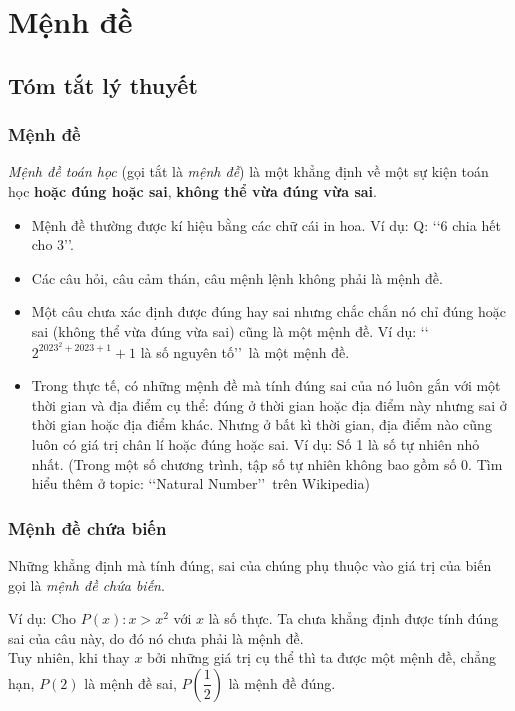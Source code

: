 \section{Mệnh đề}
\subsection{Tóm tắt lý thuyết}
\begin{tomtat}
\subsubsection{Mệnh đề}
\begin{boxdn}{}
	\textit{Mệnh đề toán học} (gọi tắt là \textit{mệnh đề}) là một khẳng định về một sự kiện toán học \textbf{hoặc đúng hoặc sai}, \textbf{không thể vừa đúng vừa sai}.	
	\begin{itemize}
		\item Mệnh đề thường được kí hiệu bằng các chữ cái in hoa. Ví dụ: Q: \lq\lq 6 chia hết cho 3\rq\rq.
	\end{itemize}
\end{boxdn}

\begin{note}
	\begin{itemize}
		\item Các câu hỏi, câu cảm thán, câu mệnh lệnh không phải là mệnh đề.
		\item Một câu chưa xác định được đúng hay sai nhưng chắc chắn nó chỉ đúng hoặc sai (không thể vừa đúng vừa sai) cũng là một mệnh đề. Ví dụ: \lq\lq $2^{2023^2+2023+1}+1$ là số nguyên tố\rq\rq\ là một mệnh đề.
		\item Trong thực tế, có những mệnh đề mà tính đúng sai của nó luôn gắn với một thời gian và địa điểm cụ thể: đúng ở thời gian hoặc địa điểm này nhưng sai ở thời gian hoặc địa điểm khác. Nhưng ở bất kì thời gian, địa điểm nào cũng luôn có giá trị chân lí hoặc đúng hoặc sai. Ví dụ: Số 1 là số tự nhiên nhỏ nhất. (Trong một số chương trình, tập số tự nhiên không bao gồm số 0. Tìm hiểu thêm ở topic: \lq\lq Natural Number\rq\rq\ trên Wikipedia) 
	\end{itemize}
\end{note}
\subsubsection{Mệnh đề chứa biến}
\begin{boxdn}{}
	Những khẳng định mà tính đúng, sai của chúng phụ thuộc vào giá trị của biến gọi là \textit{mệnh đề chứa biến}.
\end{boxdn}
Ví dụ: Cho $P(x): x>x^2$ với $x$ là số thực. Ta chưa khẳng định được tính đúng sai của câu này, do đó nó chưa phải là mệnh đề.\\
Tuy nhiên, khi thay $x$ bởi những giá trị cụ thể thì ta được một mệnh đề, chẳng hạn, $P(2)$ là mệnh đề sai, $P\left(\dfrac{1}{2}\right)$ là mệnh đề đúng.


\end{tomtat}
